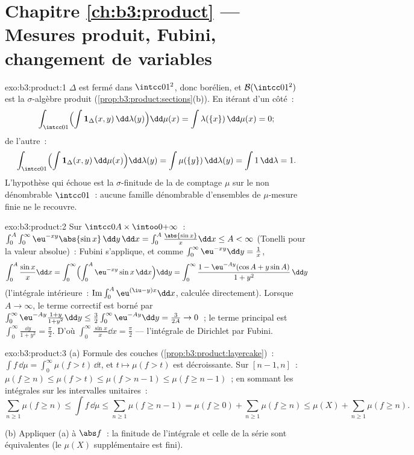 \section*{Chapitre \ref{ch:b3:product} --- Mesures produit,
Fubini, changement de variables}

\begin{solution}{exo:b3:product:1}
$\Delta$ est fermé dans $\intcc01^2$, donc borélien, et
$\mathcal B(\intcc01^2)$ est la $\sigma$-algèbre produit
(\cref{prop:b3:product:sections}(b)). En itérant d'un côté~:
\[
\int_{\intcc01}\Bigl(\int \mathbf 1_\Delta(x,y)
\,\dd\lambda(y)\Bigr)\dd\mu(x)
= \int \lambda(\{x\})\,\dd\mu(x) = 0 ;
\]
de l'autre~:
\[
\int_{\intcc01}\Bigl(\int\mathbf
1_\Delta(x,y)\,\dd\mu(x)\Bigr)\dd\lambda(y)
= \int \mu(\{y\})\,\dd\lambda(y) = \int 1\,\dd\lambda = 1 .
\]
L'hypothèse qui échoue est la $\sigma$-finitude de la 
de comptage $\mu$ sur le non dénombrable $\intcc01$~: aucune
famille dénombrable d'ensembles de $\mu$-mesure finie ne le
recouvre.
\end{solution}

\begin{solution}{exo:b3:product:2}
Sur $\intcc0A\times\intoo0{+\infty}$~:
$\int_0^A\int_0^\infty\eu^{-xy}\abs{\sin x}\,\dd y\,\dd x =
\int_0^A\frac{\abs{\sin x}}x\dd x \leq A < \infty$ (Tonelli
pour la valeur absolue)~: Fubini s'applique, et comme
$\int_0^\infty\eu^{-xy}\dd y = \frac1x$,
\[
\int_0^A\frac{\sin x}x\dd x
= \int_0^\infty\Bigl(\int_0^A\eu^{-xy}\sin x\,\dd
x\Bigr)\dd y
= \int_0^\infty \frac{1 - \eu^{-Ay}(\cos A + y\sin A)}{1 +
y^2}\,\dd y
\]
(l'intégrale intérieure~: $\operatorname{Im}\int_0^A\eu^{(\iu -
y)x}\dd x$, calculée directement). Lorsque $A \to \infty$, le
terme correctif est borné par $\int_0^\infty\eu^{-Ay}\frac{1 +
y}{1 + y^2}\dd y \leq \frac32\int_0^\infty\eu^{-Ay}\dd y =
\frac3{2A} \to 0$~; le terme principal est
$\int_0^\infty\frac{\dd y}{1+y^2} = \frac\pi2$. D'où
$\int_0^\infty\frac{\sin x}x\dd x = \frac\pi2$ ---
l'intégrale de Dirichlet par Fubini.
\end{solution}

\begin{solution}{exo:b3:product:3}
(a) Formule des couches (\cref{prop:b3:product:layercake})~:
$\int f\,\dd\mu = \int_0^\infty\mu(f > t)\,\dd t$, et $t
\mapsto \mu(f > t)$ est décroissante. Sur $[n-1, n]$~:
$\mu(f \geq n) \leq \mu(f > t) \leq \mu(f > n - 1) \leq
\mu(f \geq n - 1)$~; en sommant les intégrales sur les
intervalles unitaires~:
\[
\sum_{n\geq1}\mu(f \geq n) \leq \int f\,\dd\mu \leq
\sum_{n\geq1}\mu(f \geq n - 1) = \mu(f \geq 0) +
\sum_{n\geq1}\mu(f\geq n) \leq \mu(X) + \sum_{n\geq1}\mu(f\geq
n).
\]

(b) Appliquer (a) à $\abs f$~: la finitude de l'intégrale et
celle de la série sont équivalentes (le $\mu(X)$
supplémentaire est fini).
\end{solution}

